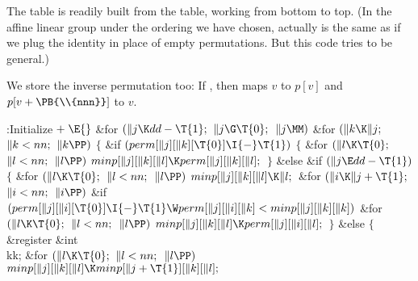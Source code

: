 The  table is readily built from the  table, working from
bottom to top. (In the affine linear group under the ordering we have chosen,
 actually is the same as  if we plug the identity in
place
of empty permutations. But this code tries to be general.)

We store the inverse permutation too: If , then
 maps $v$ to $p[v]$ and $p[v+\PB{\\{nnn}}]$ to $v$.

\Y\B\4:Initialize\X${}\mathrel+\E{}$\6
\&{for} ${}(\|j\K\\{dd}-\T{1};{}$ ${}\|j\G\T{0};{}$ ${}\|j\MM){}$\1\6
\&{for} ${}(\|k\K\|j;{}$ ${}\|k<\\{nn};{}$ ${}\|k\PP){}$\5
${}\{{}$\1\6
\&{if} ${}(\\{perm}[\|j][\|k][\T{0}]\I{-}\T{1}){}$\5
${}\{{}$\1\6
\&{for} ${}(\|l\K\T{0};{}$ ${}\|l<\\{nn};{}$ ${}\|l\PP){}$\1\5
${}\\{minp}[\|j][\|k][\|l]\K\\{perm}[\|j][\|k][\|l];{}$\2\6
\4${}\}{}$\5
\2\&{else} \&{if} ${}(\|j\E\\{dd}-\T{1}){}$\5
${}\{{}$\1\6
\&{for} ${}(\|l\K\T{0};{}$ ${}\|l<\\{nn};{}$ ${}\|l\PP){}$\1\5
${}\\{minp}[\|j][\|k][\|l]\K\|l;{}$\2\6
\&{for} ${}(\|i\K\|j+\T{1};{}$ ${}\|i<\\{nn};{}$ ${}\|i\PP){}$\1\6
\&{if} ${}(\\{perm}[\|j][\|i][\T{0}]\I{-}\T{1}\W\\{perm}[\|j][\|i][\|k]<%
\\{minp}[\|j][\|k][\|k]){}$\1\6
\&{for} ${}(\|l\K\T{0};{}$ ${}\|l<\\{nn};{}$ ${}\|l\PP){}$\1\5
${}\\{minp}[\|j][\|k][\|l]\K\\{perm}[\|j][\|i][\|l];{}$\2\2\2\6
\4${}\}{}$\5
\2\&{else}\5
${}\{{}$\1\6
\&{register} \&{int} \\{kk};\7
\&{for} ${}(\|l\K\T{0};{}$ ${}\|l<\\{nn};{}$ ${}\|l\PP){}$\1\5
${}\\{minp}[\|j][\|k][\|l]\K\\{minp}[\|j+\T{1}][\|k][\|l];{}$\2\6
